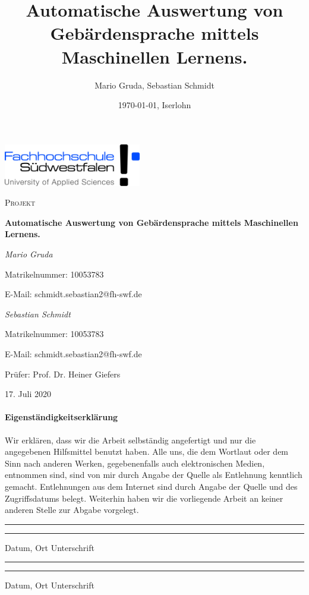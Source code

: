 \documentclass[11pt,bibliography=totocnumbered]{scrartcl}
\title{Automatische Auswertung von Gebärdensprache mittels Maschinellen Lernens.}
\author{Mario Gruda, Sebastian Schmidt}
\date{\today{}, Iserlohn}
\begin{document}
 
\setmainfont{Caladea}
\begin{titlepage}
	\centering
	\includegraphics[width=0.45\textwidth]{fh-swf-logo}\par\vspace{1cm}
	{\scshape\Large Projekt\par}
	\vspace{0.5cm}
	{\huge\bfseries Automatische Auswertung von Gebärdensprache mittels Maschinellen Lernens.\par}
	\vspace{1cm}
	{\Large\itshape Mario Gruda\par}
	Matrikelnummer: 10053783\par
	E-Mail: schmidt.sebastian2@fh-swf.de\par
	\vspace{1cm}
	{\Large\itshape Sebastian Schmidt\par}
	Matrikelnummer: 10053783\par
	E-Mail: schmidt.sebastian2@fh-swf.de\par
	\vspace{1cm}
	Prüfer: 
	Prof. Dr. Heiner Giefers
	\vfill
	
	{\large 17. Juli 2020\par}
\end{titlepage}
\pagebreak
\paragraph{Eigenständigkeitserklärung}
Wir erklären, dass wir die Arbeit selbständig angefertigt und nur die angegebenen Hilfsmittel benutzt haben. Alle uns, die dem Wortlaut oder dem Sinn nach anderen Werken, gegebenenfalls auch elektronischen Medien, entnommen sind, sind von mir durch Angabe der Quelle als Entlehnung kenntlich gemacht. Entlehnungen aus dem Internet sind durch Angabe der Quelle und des Zugriffsdatums belegt. Weiterhin haben wir die vorliegende 
Arbeit an keiner anderen Stelle zur Abgabe vorgelegt.

\vspace{50pt}
\noindent\rule{5cm}{.4pt}\hspace{4.8cm}\rule{5cm}{.4pt}\par
\noindent Datum, Ort \hspace{10.5cm} Unterschrift\par
\vspace{50pt}
\noindent\rule{5cm}{.4pt}\hspace{4.8cm}\rule{5cm}{.4pt}\par
\noindent Datum, Ort \hspace{10.5cm} Unterschrift
\pagebreak
\tableofcontents
\pagebreak
\listoffigures
\lstlistoflistings
\pagebreak
\listofmyequations
\pagebreak
{}
\pagestyle{scrheadings}
\clearscrheadfoot
\ohead[\pagemark]{\pagemark}
\ihead[]{\headmark}
\setcounter{equation}{0}
\end{document}
